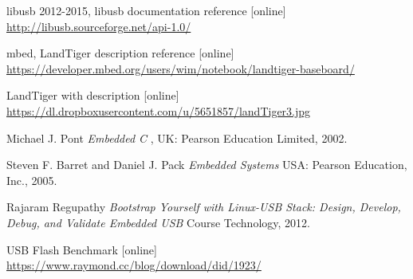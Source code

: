 \documentclass{BscUS}
\begin{document}
\begin{thebibliography}{1}
 libusb 2012-2015, libusb documentation reference [online]
\newline 
\url{http://libusb.sourceforge.net/api-1.0/}


 mbed, LandTiger description reference [online]
\newline 
\url{https://developer.mbed.org/users/wim/notebook/landtiger-baseboard/}

 LandTiger with description [online] \\
\url{https://dl.dropboxusercontent.com/u/5651857/landTiger3.jpg}

 Michael J. Pont {\em Embedded C       },  UK: Pearson Education Limited, 2002.

 Steven F. Barret and Daniel J. Pack {\em Embedded Systems} USA: Pearson Education, Inc., 2005.

 Rajaram Regupathy {\em Bootstrap Yourself with Linux-USB Stack: Design, Develop, Debug, and Validate Embedded USB } Course Technology, 2012.


 USB Flash Benchmark [online] \\
\url{https://www.raymond.cc/blog/download/did/1923/}
\end{thebibliography}
\end{document}
